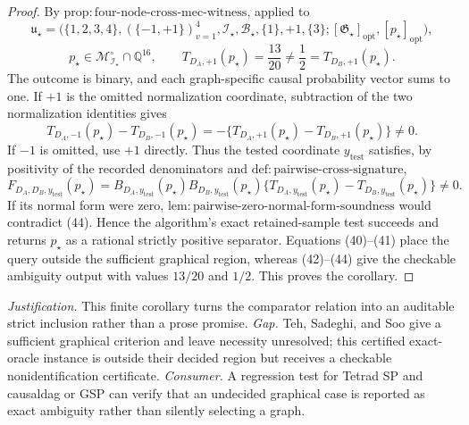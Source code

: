 \documentclass{article}
\begin{document}
\begin{proof}
By \(\mathrm{prop{:}four\text{-}node\text{-}cross\text{-}mec\text{-}witness}\), applied to
\[
 \mathfrak u_\star=
 \bigl(\{1,2,3,4\},(\{-1,+1\})_{v=1}^4,
 \mathcal I_\star,\mathcal B_\star,\{1\},+1,\{3\};
 [\mathfrak G_\star]_{\mathrm{opt}},[p_\star]_{\mathrm{opt}}\bigr),
\]
\[
 p_\star\in\mathcal M_{\mathcal I_\star}^{\circ}\cap\mathbb Q^{16},
 \qquad
 T_{D_A,+1}(p_\star)=\frac{13}{20}\neq
 \frac12=T_{D_B,+1}(p_\star). \tag{42}
\]
The outcome is binary, and each graph-specific causal probability vector sums to one.  If \(+1\) is the omitted normalization coordinate, subtraction of the two normalization identities gives
\[
 T_{D_A,-1}(p_\star)-T_{D_B,-1}(p_\star)
 =-\{T_{D_A,+1}(p_\star)-T_{D_B,+1}(p_\star)\}\neq0. \tag{43}
\]
If \(-1\) is omitted, use \(+1\) directly.  Thus the tested coordinate \(y_{\mathrm{test}}\) satisfies, by positivity of the recorded denominators and \(\mathrm{def{:}pairwise\text{-}cross\text{-}signature}\),
\[
 F_{D_A,D_B,y_{\mathrm{test}}}(p_\star)
 =B_{D_A,y_{\mathrm{test}}}(p_\star)
  B_{D_B,y_{\mathrm{test}}}(p_\star)
 \{T_{D_A,y_{\mathrm{test}}}(p_\star)
  -T_{D_B,y_{\mathrm{test}}}(p_\star)\}\neq0. \tag{44}
\]
If its normal form were zero, \(\mathrm{lem{:}pairwise\text{-}zero\text{-}normal\text{-}form\text{-}soundness}\) would contradict (44).  Hence the algorithm's exact retained-sample test succeeds and returns \(p_\star\) as a rational strictly positive separator.  Equations (40)--(41) place the query outside the sufficient graphical region, whereas (42)--(44) give the checkable ambiguity output with values \(13/20\) and \(1/2\).  This proves the corollary.
\end{proof}
\par\smallskip\noindent \textit{Justification.} This finite corollary turns the comparator relation into an auditable strict inclusion rather than a prose promise. \textit{Gap.} Teh, Sadeghi, and Soo give a sufficient graphical criterion and leave necessity unresolved; this certified exact-oracle instance is outside their decided region but receives a checkable nonidentification certificate. \textit{Consumer.} A regression test for Tetrad SP and causaldag or GSP can verify that an undecided graphical case is reported as exact ambiguity rather than silently selecting a graph.
\end{document}
